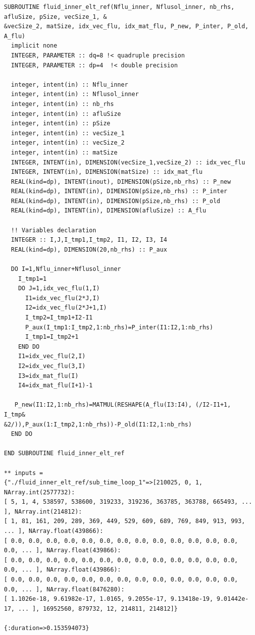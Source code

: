 \documentclass[10pt,twoside]{article}   	%
\begin{document}
\begin{lstlisting}[caption=Results (obtained with the command ruby run\_ref.rb)]
SUBROUTINE fluid_inner_elt_ref(Nflu_inner, Nflusol_inner, nb_rhs, afluSize, pSize, vecSize_1, &
&vecSize_2, matSize, idx_vec_flu, idx_mat_flu, P_new, P_inter, P_old, A_flu)
  implicit none
  INTEGER, PARAMETER :: dq=8 !< quadruple precision
  INTEGER, PARAMETER :: dp=4  !< double precision

  integer, intent(in) :: Nflu_inner
  integer, intent(in) :: Nflusol_inner
  integer, intent(in) :: nb_rhs
  integer, intent(in) :: afluSize
  integer, intent(in) :: pSize
  integer, intent(in) :: vecSize_1
  integer, intent(in) :: vecSize_2
  integer, intent(in) :: matSize
  INTEGER, INTENT(in), DIMENSION(vecSize_1,vecSize_2) :: idx_vec_flu
  INTEGER, INTENT(in), DIMENSION(matSize) :: idx_mat_flu
  REAL(kind=dp), INTENT(inout), DIMENSION(pSize,nb_rhs) :: P_new
  REAL(kind=dp), INTENT(in), DIMENSION(pSize,nb_rhs) :: P_inter
  REAL(kind=dp), INTENT(in), DIMENSION(pSize,nb_rhs) :: P_old
  REAL(kind=dp), INTENT(in), DIMENSION(afluSize) :: A_flu

  !! Variables declaration
  INTEGER :: I,J,I_tmp1,I_tmp2, I1, I2, I3, I4
  REAL(kind=dp), DIMENSION(20,nb_rhs) :: P_aux

  DO I=1,Nflu_inner+Nflusol_inner
    I_tmp1=1
    DO J=1,idx_vec_flu(1,I)
      I1=idx_vec_flu(2*J,I)
      I2=idx_vec_flu(2*J+1,I)
      I_tmp2=I_tmp1+I2-I1
      P_aux(I_tmp1:I_tmp2,1:nb_rhs)=P_inter(I1:I2,1:nb_rhs)
      I_tmp1=I_tmp2+1
    END DO
    I1=idx_vec_flu(2,I)
    I2=idx_vec_flu(3,I)
    I3=idx_mat_flu(I)
    I4=idx_mat_flu(I+1)-1

   P_new(I1:I2,1:nb_rhs)=MATMUL(RESHAPE(A_flu(I3:I4), (/I2-I1+1, I_tmp&
&2/)),P_aux(1:I_tmp2,1:nb_rhs))-P_old(I1:I2,1:nb_rhs)
  END DO

END SUBROUTINE fluid_inner_elt_ref

** inputs =
{"./fluid_inner_elt_ref/sub_time_loop_1"=>[210025, 0, 1, NArray.int(2577732): 
[ 5, 1, 4, 538597, 538600, 319233, 319236, 363785, 363788, 665493, ... ], NArray.int(214812): 
[ 1, 81, 161, 209, 289, 369, 449, 529, 609, 689, 769, 849, 913, 993, ... ], NArray.float(439866): 
[ 0.0, 0.0, 0.0, 0.0, 0.0, 0.0, 0.0, 0.0, 0.0, 0.0, 0.0, 0.0, 0.0, 0.0, ... ], NArray.float(439866): 
[ 0.0, 0.0, 0.0, 0.0, 0.0, 0.0, 0.0, 0.0, 0.0, 0.0, 0.0, 0.0, 0.0, 0.0, ... ], NArray.float(439866): 
[ 0.0, 0.0, 0.0, 0.0, 0.0, 0.0, 0.0, 0.0, 0.0, 0.0, 0.0, 0.0, 0.0, 0.0, ... ], NArray.float(8476280): 
[ 1.1026e-18, 9.61982e-17, 1.0165, 9.2055e-17, 9.13418e-19, 9.01442e-17, ... ], 16952560, 879732, 12, 214811, 214812]}

{:duration=>0.153594073}
\end{lstlisting}
\end{document}
